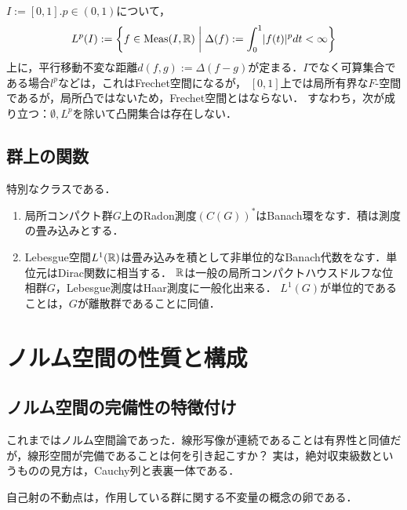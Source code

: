 \documentclass[uplatex,dvipdfmx]{jsreport}
\begin{document}
\begin{example}
    $I:=[0,1].p\in(0,1)$について，
    \[L^p(I):=\left\{f\in\mathrm{Meas}(I,\mathbb{R})\;\middle|\;\Delta(f):=\int^1_0\lvert f(t)\rvert^pdt<\infty\right\}\]
    上に，平行移動不変な距離$d(f,g):=\Delta(f-g)$が定まる．$I$でなく可算集合である場合$l^p$などは，これはFrechet空間になるが，
    $[0,1]$上では局所有界な$F$-空間であるが，局所凸ではないため，Frechet空間とはならない．
    すなわち，次が成り立つ：$\emptyset,L^p$を除いて凸開集合は存在しない．
\end{example}

\subsection{群上の関数}

\begin{example}
    特別なクラスである．
    \begin{enumerate}
        \item 局所コンパクト群$G$上のRadon測度$(C(G))^*$はBanach環をなす．積は測度の畳み込みとする．
        \item Lebesgue空間$L^1(\mathbb{R})$は畳み込みを積として非単位的なBanach代数をなす．単位元はDirac関数に相当する．
        $\mathbb{R}$は一般の局所コンパクトハウスドルフな位相群$G$，Lebesgue測度はHaar測度に一般化出来る．
        $L^1(G)$が単位的であることは，$G$が離散群であることに同値．
    \end{enumerate}
\end{example}

\section{ノルム空間の性質と構成}

\subsection{ノルム空間の完備性の特徴付け}

\begin{tcolorbox}[colframe=ForestGreen, colback=ForestGreen!10!white,breakable,colbacktitle=ForestGreen!40!white,coltitle=black,fonttitle=\bfseries\sffamily,
title=]
    これまではノルム空間論であった．線形写像が連続であることは有界性と同値だが，線形空間が完備であることは何を引き起こすか？
    実は，絶対収束級数というものの見方は，Cauchy列と表裏一体である．

    自己射の不動点は，作用している群に関する不変量の概念の卵である．
\end{tcolorbox}
\end{document}
